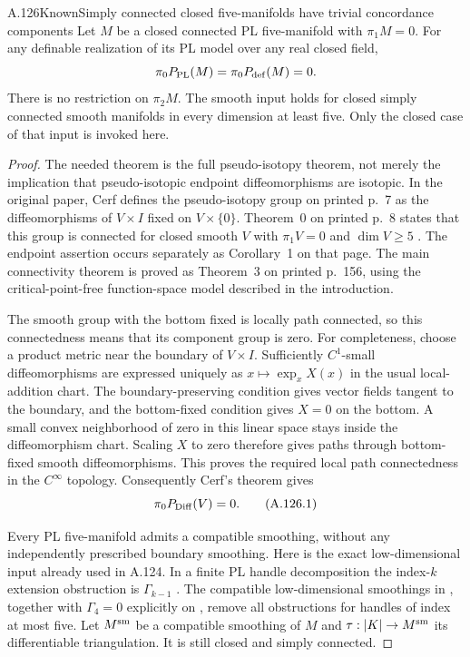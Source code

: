 \begin{saresult}{A.126}{Known}{Simply connected closed five-manifolds have trivial concordance components}
Let $M$ be a closed connected PL five-manifold with $\pi_1M=0$.
For any definable realization of its PL model over any real closed
field,
\[
 \pi_0P_{\rm PL}(M)=\pi_0P_{\rm def}(M)=0.
\]
There is no restriction on $\pi_2M$. The smooth input holds for
closed simply connected smooth manifolds in every dimension at
least five. Only the closed case of that input is invoked here.
\end{saresult}
\begin{proof}
The needed theorem is the full pseudo-isotopy theorem, not merely
the implication that pseudo-isotopic endpoint diffeomorphisms are
isotopic. In the original paper, Cerf defines the pseudo-isotopy
group on printed p.~7 as the diffeomorphisms of $V\times I$
fixed on $V\times\{0\}$. Theorem~0 on printed p.~8 states that
this group is connected for closed smooth $V$ with
$\pi_1V=0$ and $\dim V\geq5$
\cite[Introduction, Definition~2 and Theorem~0, pp.~7--8]{Cerf1970}.
The endpoint assertion occurs separately as Corollary~1 on that
page. The main connectivity theorem is proved as Theorem~3 on
printed p.~156, using the critical-point-free function-space
model described in the introduction.

The smooth group with the bottom fixed is locally path connected,
so this connectedness means that its component group is zero.
For completeness, choose a product metric near the boundary of
$V\times I$. Sufficiently $C^1$-small diffeomorphisms are expressed
uniquely as $x\mapsto\exp_x X(x)$ in the usual local-addition
chart. The boundary-preserving condition gives vector fields
tangent to the boundary, and the bottom-fixed condition gives
$X=0$ on the bottom. A small convex neighborhood of zero in this
linear space stays inside the diffeomorphism chart. Scaling $X$
to zero therefore gives paths through bottom-fixed smooth
diffeomorphisms. This proves the required local path connectedness
in the $C^\infty$ topology. Consequently Cerf's theorem gives
\[
 \pi_0P_{\rm Diff}(V)=0.                              \tag{A.126.1}
\]

Every PL five-manifold admits a compatible smoothing, without any
independently prescribed boundary smoothing. Here is the exact
low-dimensional input already used in A.124. In a finite PL handle
decomposition the index-$k$ extension obstruction is
$\Gamma_{k-1}$
\cite[Essay~IV, Appendix~B, p.~211]{KirbySiebenmann1977}.
The compatible low-dimensional smoothings in
\cite[Essay~I, p.~39]{KirbySiebenmann1977}, together with
$\Gamma_4=0$ explicitly on
\cite[Essay~IV, p.~200]{KirbySiebenmann1977}, remove all obstructions
for handles of index at most five. Let $M^{\rm sm}$ be a compatible
smoothing of $M$ and $\tau:|K|\to M^{\rm sm}$ its differentiable
triangulation. It is still closed and simply connected.


\end{proof}
